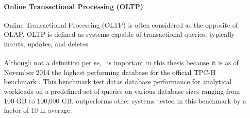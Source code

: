 \paragraph{Online Transactional Processing (OLTP)}
\label{par:Online Transactional Processing (OLTP)}
Online Transactional Processing (OLTP) is often considered as the opposite of OLAP. OLTP is defined as systems capable of transactional queries, typically inserts, updates, and deletes. 

\paragraph{\exasol}
\label{par:exasol}
Although not a definition per se, \exasol~is important in this thesis because it is as of November 2014 the highest performing database for the official TPC-H benchmark \cite{noauthor_undated-vr}. This benchmark test datas database performance for analytical workloads on a predefined set of queries on various database sizes ranging from 100 GB to 100,000 GB. \exasol outperforms other systems tested in this benchmark by a factor of 10 in average.




